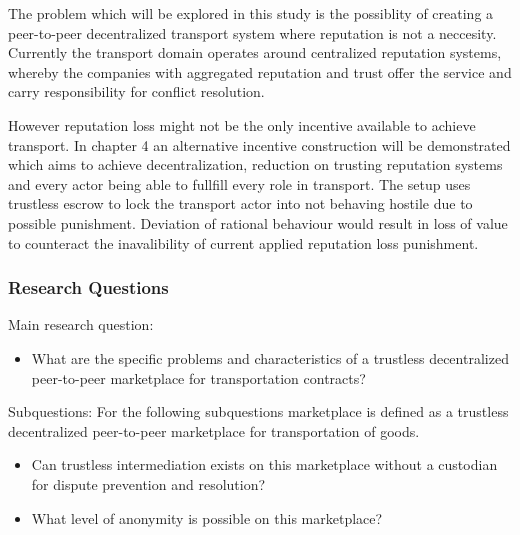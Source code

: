 The problem which will be explored in this study is the possiblity of creating a peer-to-peer decentralized transport system where reputation is not a neccesity. Currently the transport domain operates around centralized reputation systems, whereby the companies with aggregated reputation and trust offer the service and carry responsibility for conflict resolution.\par
However reputation loss might not be the only incentive available to achieve transport. In chapter 4 an alternative incentive construction will be demonstrated which aims to achieve decentralization, reduction on trusting reputation systems and every actor being able to fullfill every role in transport. The setup uses trustless escrow to lock the transport actor into not behaving hostile due to possible punishment. Deviation of rational behaviour would result in loss of value to counteract the inavalibility of current applied reputation loss punishment.

\subsubsection{Research Questions}

\bigbreak
\noindent Main research question:
\begin{itemize}
  \item What are the specific problems and characteristics of a trustless decentralized peer-to-peer marketplace for transportation contracts?
\end{itemize}
\bigbreak
\noindent Subquestions:
\bigbreak
\noindent For the following subquestions marketplace is defined as a trustless decentralized peer-to-peer marketplace for transportation of goods.
\begin{itemize}
  \item Can trustless intermediation exists on this marketplace without a custodian for dispute prevention and resolution?
  \item What level of anonymity is possible on this marketplace?
\end{itemize}

